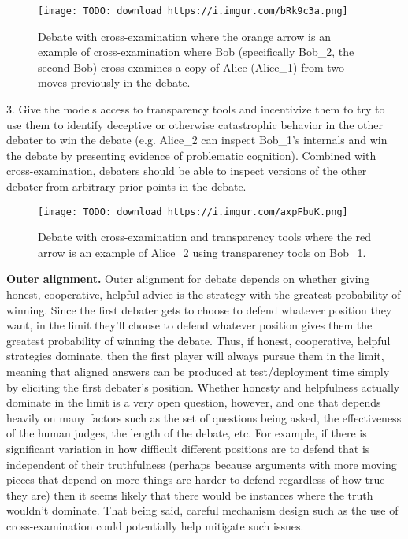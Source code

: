 \begin{figure}[h!]
  \centering
  \texttt{[image: TODO: download https://i.imgur.com/bRk9c3a.png]}
  \caption{Debate with cross-examination where the orange arrow is an example of cross-examination where Bob (specifically Bob_2, the second Bob) cross-examines a copy of Alice (Alice_1) from two moves previously in the debate.}
\end{figure}

3. Give the models access to transparency tools and incentivize them to try to use them to identify deceptive\cite{TODO: cite https://www.alignmentforum.org/posts/zthDPAjh9w6Ytbeks/deceptive-alignment} or otherwise catastrophic\cite{TODO: cite https://ai-alignment.com/learning-with-catastrophes-59387b55cc30} behavior in the other debater to win the debate (e.g. Alice_2 can inspect Bob_1's internals and win the debate by presenting evidence of problematic cognition). Combined with cross-examination, debaters should be able to inspect versions of the other debater from arbitrary prior points in the debate.

\begin{figure}[h!]
  \centering
  \texttt{[image: TODO: download https://i.imgur.com/axpFbuK.png]}
  \caption{Debate with cross-examination and transparency tools where the red arrow is an example of Alice_2 using transparency tools on Bob_1.}
\end{figure}

\textbf{Outer alignment.} Outer alignment for debate depends on whether giving honest, cooperative, helpful advice is the strategy with the greatest probability of winning. Since the first debater gets to choose to defend whatever position they want, in the limit they'll choose to defend whatever position gives them the greatest probability of winning the debate. Thus, if honest, cooperative, helpful strategies dominate, then the first player will always pursue them in the limit, meaning that aligned answers can be produced at test/deployment time simply by eliciting the first debater's position. Whether honesty and helpfulness actually dominate in the limit is a very open question, however, and one that depends heavily on many factors such as the set of questions being asked, the effectiveness of the human judges, the length of the debate, etc. For example, if there is significant variation in how difficult different positions are to defend that is independent of their truthfulness (perhaps because arguments with more moving pieces that depend on more things are harder to defend regardless of how true they are) then it seems likely that there would be instances where the truth wouldn't dominate. That being said, careful mechanism design such as the use of cross-examination could potentially help mitigate such issues.

